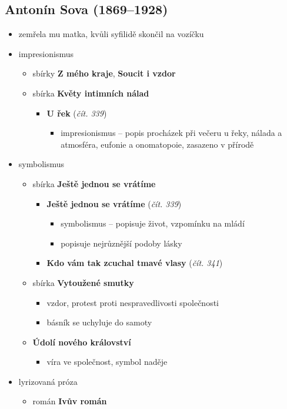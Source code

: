 \subsection{Antonín Sova (1869--1928)}
\begin{itemize}
\item zemřela mu matka, kvůli syfilidě skončil na vozíčku	
\item impresionismus
	\begin{itemize}
	\item sbírky \textbf{Z mého kraje}, \textbf{Soucit i vzdor}
	\item sbírka \textbf{Květy intimních nálad}
		\begin{itemize}
		\item \textbf{U řek} (\textit{čít. 339})
			\begin{itemize}
			\item impresionismus -- popis procházek při večeru u řeky, nálada a atmosféra, eufonie a onomatopoie, zasazeno v přírodě
			\end{itemize}
		\end{itemize}
	\end{itemize}
\item symbolismus
	\begin{itemize}
	\item sbírka \textbf{Ještě jednou se vrátíme}
		\begin{itemize}
		\item \textbf{Ještě jednou se vrátíme} (\textit{čít. 339})
			\begin{itemize}
			\item symbolismus -- popisuje život, vzpomínku na mládí
			\item popisuje nejrůznější podoby lásky
			\end{itemize}
		\item \textbf{Kdo vám tak zcuchal tmavé vlasy} (\textit{čít. 341})
		\end{itemize}
	\item sbírka \textbf{Vytoužené smutky}
		\begin{itemize}
		\item vzdor, protest proti nespravedlivosti společnosti
		\item básník se uchyluje do samoty
		\end{itemize}
	\item \textbf{Údolí nového království}
		\begin{itemize}
		\item víra ve společnost, symbol naděje
		\end{itemize}
	\end{itemize}
\item lyrizovaná próza
	\begin{itemize}
	\item román \textbf{Ivův román}
	\end{itemize}
\end{itemize}

